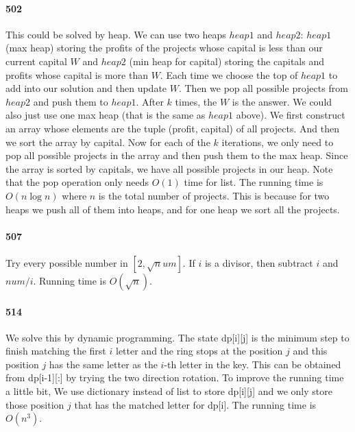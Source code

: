 \documentclass[11pt]{article}
\begin{document}
\begin{itemize}
\paragraph{502}
This could be solved by heap. We can use two heaps $heap1$ and $heap2$: $heap1$ (max heap) storing the profits of the projects 
whose capital is less than our current capital $W$ and $heap2$ (min heap for capital) storing the capitals and profits whose
capital is more than $W$. Each time we choose the top of $heap1$ to add into our solution and then update $W$. 
Then we pop all possible projects from $heap2$ and push them to $heap1$. After $k$ times, the $W$ is the answer.
We could also just use one max heap (that is the same as $heap1$ above). We first construct an array whose elements are the tuple
(profit, capital) of all projects. And then we sort the array by capital. 
Now for each of the $k$ iterations, we only need to pop all possible projects in the array and then push them to the max heap. 
Since the array is sorted by capitals, we have all possible projects in our heap.
Note that the pop operation only needs $O(1)$ time for list.
The running time is $O(n \log n)$ where $n$ is the total number of projects. This is because for two heaps we push all of them 
into heaps, and for one heap we sort all the projects.

\paragraph{507}
Try every possible number in $[2, \sqrt num]$. If $i$ is a divisor, then subtract $i$ and $num/i$. 
Running time is $O(\sqrt n)$.

\paragraph{514}
We solve this by dynamic programming.
The state dp[i][j] is the minimum step to finish matching the first $i$ letter and the ring stops at the position $j$ and 
this position $j$ has the same letter as the $i$-th letter in the key. This can be obtained from dp[i-1][:] by trying the 
two direction rotation. To improve the running time a little bit, We use dictionary instead of list to store dp[i][j] and
we only store those position $j$ that has the matched letter for dp[i].
The running time is $O(n^3)$.


\end{itemize}
\end{document}
